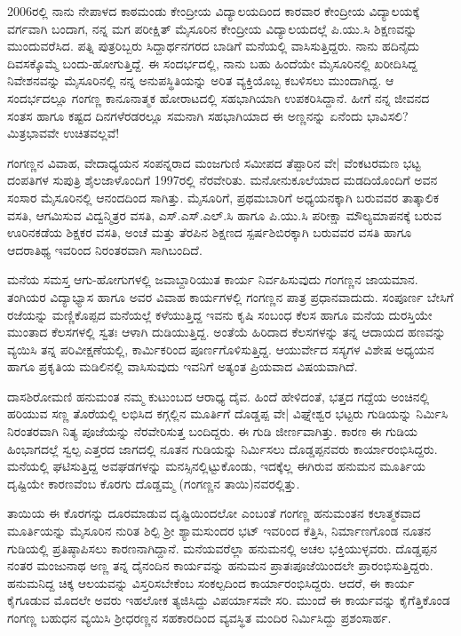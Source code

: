 2006ರಲ್ಲಿ ನಾನು ನೇಪಾಳದ ಕಾಠಮಂಡು ಕೇಂದ್ರೀಯ ವಿದ್ಯಾಲಯದಿಂದ ಕಾರವಾರ ಕೇಂದ್ರೀಯ ವಿದ್ಯಾಲಯಕ್ಕೆ ವರ್ಗವಾಗಿ ಬಂದಾಗ, ನನ್ನ ಮಗ ಪರೀಕ್ಷಿತ್ ಮೈಸೂರಿನ ಕೇಂದ್ರೀಯ ವಿದ್ಯಾಲಯದಲ್ಲೆ ಪಿ.ಯು.ಸಿ ಶಿಕ್ಷಣವನ್ನು ಮುಂದುವರೆಸಿದ. ಪತ್ನಿ ಪುತ್ರರಿಬ್ಬರು ಸಿದ್ದಾರ್ಥನಗರದ ಬಾಡಿಗೆ ಮನೆಯಲ್ಲಿ ವಾಸಿಸುತ್ತಿದ್ದರು. ನಾನು ಹದಿನೈದು ದಿವಸಕ್ಕೊಮ್ಮೆ ಬಂದು-ಹೋಗುತ್ತಿದ್ದೆ. ಈ ಸಂದರ್ಭದಲ್ಲಿ, ನಾನು ಬಹು ಹಿಂದೆಯೇ ಮೈಸೂರಿನಲ್ಲಿ ಖರೀದಿಸಿದ್ದ ನಿವೇಶನವನ್ನು ಮೈಸೂರಿನಲ್ಲಿ ನನ್ನ ಅನುಪಸ್ಥಿತಿಯನ್ನು ಅರಿತ ವ್ಯಕ್ತಿಯೊಬ್ಬ ಕಬಳಿಸಲು ಮುಂದಾಗಿದ್ದ. ಆ ಸಂದರ್ಭದಲ್ಲೂ ಗಂಗಣ್ಣ ಕಾನೂನಾತ್ಮಕ ಹೋರಾಟದಲ್ಲಿ ಸಹಭಾಗಿಯಾಗಿ ಉಪಕರಿಸಿದ್ದಾನೆ. ಹೀಗೆ ನನ್ನ ಜೀವನದ ಸಂತಸ ಹಾಗೂ ಕಷ್ಟದ ದಿನಗಳೆರಡರಲ್ಲೂ ಸಮನಾಗಿ ಸಹಭಾಗಿಯಾದ ಈ ಅಣ್ಣನನ್ನು ಏನೆಂದು ಭಾವಿಸಲಿ? ಮಿತ್ರಭಾವವೇ ಉಚಿತವಲ್ಲವೆ!

ಗಂಗಣ್ಣನ ವಿವಾಹ, ವೇದಾಧ್ಯಯನ ಸಂಪನ್ನರಾದ ಮಂಜಗುಣಿ ಸಮೀಪದ ತೆಪ್ಪಾರಿನ ವೇ| ವೆಂಕಟರಮಣ ಭಟ್ಟ ದಂಪತಿಗಳ ಸುಪುತ್ರಿ ಶೈಲಜಾಳೊಂದಿಗೆ 1997ರಲ್ಲಿ ನೆರವೇರಿತು. ಮನೋನುಕೂಲೆಯಾದ ಮಡದಿಯೊಂದಿಗೆ ಅವನ ಸಂಸಾರ ಮೈಸೂರಿನಲ್ಲಿ ಆನಂದದಿಂದ ಸಾಗಿತ್ತು. ಮೈಸೂರಿಗೆ, ಪ್ರಥಮಬಾರಿಗೆ ಅಧ್ಯಯನಕ್ಕಾಗಿ ಬರುವವರ ತಾತ್ಕಾಲಿಕ ವಸತಿ, ಆಗಮಿಸುವ ವಿದ್ವನ್ಮಿತ್ರರ ವಸತಿ, ಎಸ್.ಎಸ್.ಎಲ್.ಸಿ ಹಾಗೂ ಪಿ.ಯು.ಸಿ ಪರೀಕ್ಷಾ ಮೌಲ್ಯಮಾಪನಕ್ಕೆ ಬರುವ ಊರಿನಕಡೆಯ ಶಿಕ್ಷಕರ ವಸತಿ, ಅಂಚೆ ಮತ್ತು ತೆರಪಿನ ಶಿಕ್ಷಣದ ಸ್ಪರ್ಷಶಿಬಿರಕ್ಕಾಗಿ ಬರುವವರ ವಸತಿ ಹಾಗೂ ಆದರಾತಿಥ್ಯ ಇವರಿಂದ ನಿರಂತರವಾಗಿ ಸಾಗಿಬಂದಿದೆ.

ಮನೆಯ ಸಮಸ್ತ ಆಗು-ಹೋಗುಗಳಲ್ಲಿ ಜವಾಬ್ದಾರಿಯುತ ಕಾರ್ಯ ನಿರ್ವಹಿಸುವುದು ಗಂಗಣ್ಣನ ಜಾಯಮಾನ. ತಂಗಿಯರ ವಿದ್ಯಾಭ್ಯಾಸ ಹಾಗೂ ಅವರ ವಿವಾಹ ಕಾರ್ಯಗಳಲ್ಲಿ ಗಂಗಣ್ಣನ ಪಾತ್ರ ಪ್ರಧಾನವಾದುದು. ಸಂಪೂರ್ಣ ಬೇಸಿಗೆ ರಜೆಯನ್ನು ಮಣ್ಣಿಕೊಪ್ಪದ ಮನೆಯಲ್ಲೆ ಕಳೆಯುತ್ತಿದ್ದ ಇವನು ಕೃಷಿ ಸಂಬಂಧ ಕೆಲಸ ಹಾಗೂ ಮನೆಯ ದುರಸ್ತಿಯೇ ಮುಂತಾದ ಕೆಲಸಗಳಲ್ಲಿ ಸ್ವತಃ ಆಳಾಗಿ ದುಡಿಯುತ್ತಿದ್ದ. ಅಂತೆಯೆ ಹಿರಿದಾದ ಕೆಲಸಗಳನ್ನು ತನ್ನ ಆದಾಯದ ಹಣವನ್ನು ವ್ಯಯಿಸಿ ತನ್ನ ಪರಿವೀಕ್ಷಣೆಯಲ್ಲಿ, ಕಾರ್ಮಿಕರಿಂದ ಪೂರ್ಣಗೊಳಿಸುತ್ತಿದ್ದ. ಆಯುರ್ವೇದ ಸಸ್ಯಗಳ ವಿಶೇಷ ಅಧ್ಯಯನ ಹಾಗೂ ಪ್ರಕೃತಿಯ ಮಡಿಲಿನಲ್ಲಿ ವಾಸಿಸುವುದು ಇವನಿಗೆ ಅತ್ಯಂತ ಪ್ರಿಯವಾದ ವಿಷಯವಾಗಿದೆ.

ದಾಸಶಿರೋಮಣಿ ಹನುಮಂತ ನಮ್ಮ ಕುಟುಂಬದ ಆರಾಧ್ಯ ದೈವ. ಹಿಂದೆ ಹೇಳಿದಂತೆ, ಭತ್ತದ ಗದ್ದೆಯ ಅಂಚಿನಲ್ಲಿ ಹರಿಯುವ ಸಣ್ಣ ತೊರೆಯಲ್ಲಿ ಲಭಿಸಿದ ಕಗ್ಗಲ್ಲಿನ ಮೂರ್ತಿಗೆ ದೊಡ್ಡಪ್ಪ ವೇ| ವಿಘ್ನೇಶ್ವರ ಭಟ್ಟರು ಗುಡಿಯನ್ನು ನಿರ್ಮಿಸಿ ನಿರಂತರವಾಗಿ ನಿತ್ಯ ಪೂಜೆಯನ್ನು ನೆರವೇರಿಸುತ್ತ ಬಂದಿದ್ದರು. ಈ ಗುಡಿ ಜೀರ್ಣವಾಗಿತ್ತು. ಕಾರಣ ಈ ಗುಡಿಯ ಹಿಂಭಾಗದಲ್ಲೆ ಸ್ವಲ್ಪ ಎತ್ತರದ ಜಾಗದಲ್ಲಿ ನೂತನ ಗುಡಿಯನ್ನು ನಿರ್ಮಿಸಲು ದೊಡ್ಡಪ್ಪನವರು ಕಾರ್ಯಾರಂಭಿಸಿದ್ದರು. ಮನೆಯಲ್ಲಿ ಘಟಿಸುತ್ತಿದ್ದ ಅವಘಡಗಳನ್ನು ಮನಸ್ಸಿನಲ್ಲಿಟ್ಟುಕೊಂಡು, ಇದಕ್ಕೆಲ್ಲ ಈಗಿರುವ ಹನುಮನ ಮೂರ್ತಿಯ ದೃಷ್ಟಿಯೇ ಕಾರಣವೆಂಬ ಕೊರಗು ದೊಡ್ಡಮ್ಮ (ಗಂಗಣ್ಣನ ತಾಯಿ)ನವರಲ್ಲಿತ್ತು. 

ತಾಯಿಯ ಈ ಕೊರಗನ್ನು ದೂರಮಾಡುವ ದೃಷ್ಟಿಯಿಂದಲೋ ಎಂಬಂತೆ ಗಂಗಣ್ಣ ಹನುಮಂತನ ಕಲಾತ್ಮಕವಾದ ಮೂರ್ತಿಯನ್ನು ಮೈಸೂರಿನ ನುರಿತ ಶಿಲ್ಪಿ ಶ್ರೀ ಶ್ಯಾಮಸುಂದರ ಭಟ್ ಇವರಿಂದ ಕೆತ್ತಿಸಿ, ನಿರ್ಮಾಣಗೊಂಡ ನೂತನ ಗುಡಿಯಲ್ಲಿ ಪ್ರತಿಷ್ಠಾಪಿಸಲು ಕಾರಣನಾಗಿದ್ದಾನೆ. ಮನೆಯವರೆಲ್ಲಾ ಹನುಮನಲ್ಲಿ ಅಚಲ ಭಕ್ತಿಯುಳ್ಳವರು. ದೊಡ್ಡಪ್ಪನ ನಂತರ ಮಂಜುನಾಥ ಅಣ್ಣ ತನ್ನ ದೈನಂದಿನ ಕಾರ್ಯವನ್ನು ಹನುಮನ ಪ್ರಾತಃಪೂಜೆಯಿಂದಲೇ ಪ್ರಾರಂಭಿಸುತ್ತಿದ್ದರು. ಹನುಮನಿದ್ದ ಚಿಕ್ಕ ಆಲಯವನ್ನು ವಿಸ್ತರಿಸಬೇಕೆಂಬ ಸಂಕಲ್ಪದಿಂದ ಕಾರ್ಯಾರಂಭಿಸಿದ್ದರು. ಆದರೆ, ಈ ಕಾರ್ಯ ಕೈಗೂಡುವ ಮೊದಲೇ ಅವರು ಇಹಲೋಕ ತ್ಯಜಿಸಿದ್ದು ವಿಪರ್ಯಾಸವೇ ಸರಿ. ಮುಂದೆ ಈ ಕಾರ್ಯವನ್ನು ಕೈಗೆತ್ತಿಕೊಂಡ ಗಂಗಣ್ಣ ಬಹುಧನ ವ್ಯಯಿಸಿ ಶ್ರೀಧರಣ್ಣನ ಸಹಕಾರದಿಂದ ವ್ಯವಸ್ಥಿತ ಮಂದಿರ ನಿರ್ಮಿಸಿದ್ದು ಪ್ರಶಂಸಾರ್ಹ.

